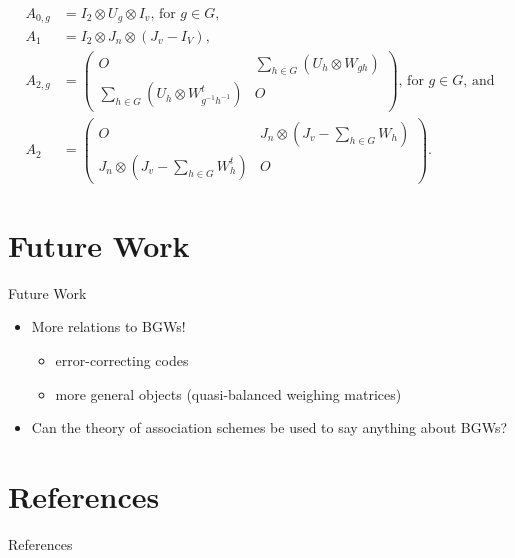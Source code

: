 \documentclass{beamer}
\begin{document}
\begin{frame}

  \begin{align*}
    A_{0,g} &= I_2 \otimes U_g \otimes I_v \text{, for $g \in G$,} \\
    A_1 &= I_2 \otimes J_n \otimes (J_v - I_V), \\
    A_{2,g} &= \begin{pmatrix}
                 O & \sum_{h \in G} (U_h \otimes W_{gh}) \\
                 \sum_{h \in G} (U_h \otimes W_{g^{-1}h^{-1}}^t) & O
               \end{pmatrix} \text{, for $g \in G$, and} \\
    A_2 &= \begin{pmatrix}
             O & J_n \otimes (J_v - \sum_{h \in G} W_h) \\
             J_n \otimes (J_v - \sum_{h \in G} W_h^t) & O
           \end{pmatrix}.
  \end{align*}
  
\end{frame}


\section{Future Work}

\begin{frame}{Future Work}

  \begin{itemize}
  \item More relations to BGWs!
    \begin{itemize}
    \item error-correcting codes
    \item more general objects (quasi-balanced weighing matrices)
    \end{itemize}
  \item Can the theory of association schemes be used to say anything about
    BGWs? 
  \end{itemize}
  
\end{frame}


\section{References}

\begin{frame}{References}
  
  
\end{frame}
\end{document}
